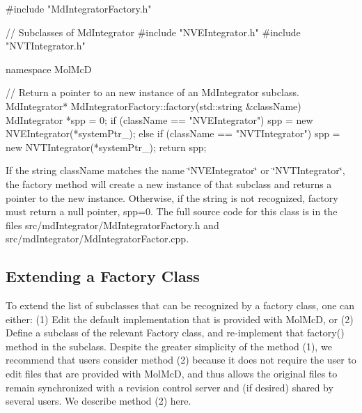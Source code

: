 \begin{DoxyCode}
#include "MdIntegratorFactory.h"

// Subclasses of MdIntegrator 
#include "NVEIntegrator.h"
#include "NVTIntegrator.h"

namespace MolMcD 
{

   // Return a pointer to an new instance of an MdIntegrator subclass.
   MdIntegrator* MdIntegratorFactory::factory(std::string &className)
   {
      MdIntegrator *spp = 0;
      if (className == "NVEIntegrator") {
         spp = new NVEIntegrator(*systemPtr_);
      } else
      if (className == "NVTIntegrator") {
         spp = new NVTIntegrator(*systemPtr_);
      }
      return spp;
   }

}
\end{DoxyCode}
 \-If the string class\-Name matches the name \char`\"{}\-N\-V\-E\-Integrator\char`\"{} or \char`\"{}\-N\-V\-T\-Integrator\char`\"{}, the factory method will create a new instance of that subclass and returns a pointer to the new instance. \-Otherwise, if the string is not recognized, factory must return a null pointer, spp=0. \-The full source code for this class is in the files src/md\-Integrator/\-Md\-Integrator\-Factory.\-h and src/md\-Integrator/\-Md\-Integrator\-Factor.\-cpp.\hypertarget{extension_page_custom_factory_extend_sec}{}\subsection{\-Extending a Factory Class}\label{extension_page_custom_factory_extend_sec}
\-To extend the list of subclasses that can be recognized by a factory class, one can either\-: (1) \-Edit the default implementation that is provided with \-Mol\-Mc\-D, or (2) \-Define a subclass of the relevant \-Factory class, and re-\/implement that factory() method in the subclass. \-Despite the greater simplicity of the method (1), we recommend that users consider method (2) because it does not require the user to edit files that are provided with \-Mol\-Mc\-D, and thus allows the original files to remain synchronized with a revision control server and (if desired) shared by several users. \-We describe method (2) here.

